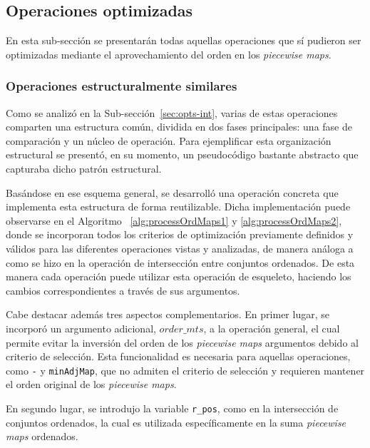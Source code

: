 \subsection{Operaciones optimizadas}

En esta sub-sección se presentarán todas aquellas operaciones que sí pudieron ser optimizadas mediante el aprovechamiento del orden en los \textit{piecewise maps}.

\subsubsection{Operaciones estructuralmente similares}

Como se analizó en la Sub-sección~\ref{sec:opts-int}, varias de estas operaciones comparten una estructura común, dividida en dos fases principales: una fase de comparación y un núcleo de operación. Para ejemplificar esta organización estructural se presentó, en su momento, un pseudocódigo bastante abstracto que capturaba dicho patrón estructural.

Basándose en ese esquema general, se desarrolló una operación concreta que implementa esta estructura de forma reutilizable. Dicha implementación puede observarse en el Algoritmo ~\ref{alg:processOrdMaps1} y \ref{alg:processOrdMaps2}, donde se incorporan todos los criterios de optimización previamente definidos y válidos para las diferentes operaciones vistas y analizadas, de manera análoga a como se hizo en la operación de intersección entre conjuntos ordenados. De esta manera cada operación puede utilizar esta operación de esqueleto, haciendo los cambios correspondientes a través de sus argumentos.

Cabe destacar además tres aspectos complementarios. En primer lugar, se incorporó un argumento adicional, $order\_mts$, a la operación general, el cual permite evitar la inversión del orden de los \textit{piecewise maps} argumentos debido al criterio de selección. Esta funcionalidad es necesaria para aquellas operaciones, como \texttt{-} y \texttt{minAdjMap}, que no admiten el criterio de selección y requieren mantener el orden original de los \textit{piecewise maps}.

En segundo lugar, se introdujo la variable \texttt{r\_pos}, como en la intersección de  conjuntos ordenados, la cual es utilizada específicamente en la suma \textit{piecewise maps} ordenados.


